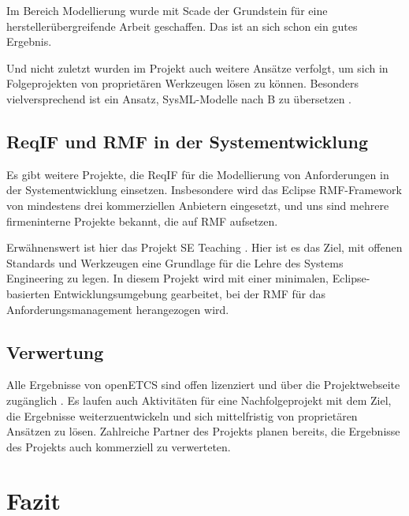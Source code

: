 \documentclass[twoside]{article}
\begin{document}
\begin{multicols}{2}
Im Bereich Modellierung wurde mit Scade der Grundstein für eine herstellerübergreifende Arbeit geschaffen.  Das ist an sich schon ein gutes Ergebnis.  

Und nicht zuletzt wurden im Projekt auch weitere Ansätze verfolgt, um sich in Folgeprojekten von proprietären Werkzeugen lösen zu können.  Besonders vielversprechend ist ein Ansatz, SysML-Modelle nach B zu übersetzen \cite{david}.

\subsection{ReqIF und RMF in der Systementwicklung}

Es gibt weitere Projekte, die ReqIF für die Modellierung von Anforderungen in der Systementwicklung einsetzen.  Insbesondere wird das Eclipse RMF-Framework von mindestens drei kommerziellen Anbietern eingesetzt, und uns sind mehrere firmeninterne Projekte bekannt, die auf RMF aufsetzen.

Erwähnenswert ist hier das Projekt SE Teaching \cite{se-teaching}.  Hier ist es das Ziel, mit offenen Standards und Werkzeugen eine Grundlage für die Lehre des Systems Engineering zu legen.  In diesem Projekt wird mit einer minimalen, Eclipse-basierten Entwicklungsumgebung gearbeitet, bei der RMF für das Anforderungsmanagement herangezogen wird.

\subsection{Verwertung}

Alle Ergebnisse von openETCS sind offen lizenziert und über die Projektwebseite zugänglich \cite{itea-openetcs}.  Es laufen auch Aktivitäten für eine Nachfolgeprojekt mit dem Ziel, die Ergebnisse weiterzuentwickeln und sich mittelfristig von proprietären Ansätzen zu lösen.  Zahlreiche Partner des Projekts planen bereits, die Ergebnisse des Projekts auch kommerziell zu verwerteten.

\section{Fazit}


\end{multicols}
\end{document}
